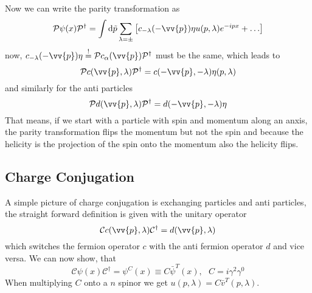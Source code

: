 \documentclass{include/thesisclass}
\newcommand{\vp}{\vv{p}}
\newcommand{\dd}{{\rm d}}
\newcommand{\soll}{\overset{!}{=}}
\begin{document}
Now we can write the parity transformation as
\[ \mathcal{P} \psi(x) \mathcal{P}^\dagger = \int \dd \tilde p \sum_{\lambda = \pm} \left[ c_{-\lambda} (-\vp) \eta u(p, \lambda) e^{-ipx} + \ldots\right]\]
now, $c_{-\lambda}(-\vp) \eta \soll \mathcal{P} c_\alpha(\vp) \mathcal{P}^\dagger$ must be the same, which leads to
\[ \mathcal{P} c(\vp , \lambda) \mathcal{P}^\dagger = c(-\vp, -\lambda) \eta(p, \lambda)\]
and similarly for the anti particles
\[ \mathcal{P} d( \vp, \lambda) \mathcal{P}^\dagger = d(-\vp, -\lambda) \eta\]
That means, if we start  with a particle with spin and momentum along an anxis, the parity transformation flips the momentum but not the spin and because the helicity is the projection of the spin onto the momentum also the helicity flips.

\subsection{Charge Conjugation}
A simple picture of charge conjugation is exchanging particles and anti particles, the straight forward definition is given with the unitary operator 
\[ \mathcal{C} c(\vp, \lambda) \mathcal{C}^\dagger = d(\vp, \lambda)\]
which switches the fermion operator $c$ with the anti fermion operator $d$ and vice versa.
We can now show, that
\[ \mathcal{C} \psi(x) \mathcal{C}^\dagger = \psi^C(x) \equiv C \bar \psi^T(x), ~~~ C = i \gamma^2 \gamma^0\]
When multiplying $C$ onto a $n$ spinor we get $u(p, \lambda) = C \bar v ^T(p, \lambda)$.
\end{document}
